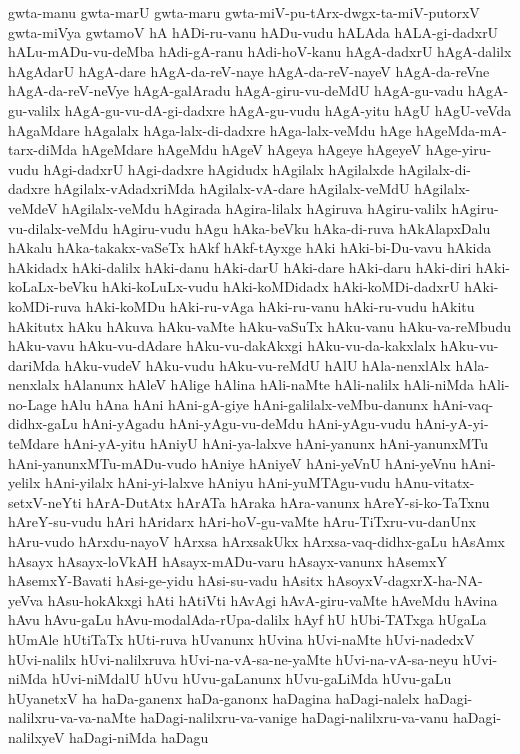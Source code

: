 {gwta-manu
gwta-marU
gwta-maru
gwta-miV-pu-tArx-dwgx-ta-miV-putorxV
gwta-miVya
gwtamoV
hA
hADi-ru-vanu
hADu-vudu
hALAda
hALA-gi-dadxrU
hALu-mADu-vu-deMba
hAdi-gA-ranu
hAdi-hoV-kanu
hAgA-dadxrU
hAgA-dalilx
hAgAdarU
hAgA-dare
hAgA-da-reV-naye
hAgA-da-reV-nayeV
hAgA-da-reVne
hAgA-da-reV-neVye
hAgA-galAradu
hAgA-giru-vu-deMdU
hAgA-gu-vadu
hAgA-gu-valilx
hAgA-gu-vu-dA-gi-dadxre
hAgA-gu-vudu
hAgA-yitu
hAgU
hAgU-veVda
hAgaMdare
hAgalalx
hAga-lalx-di-dadxre
hAga-lalx-veMdu
hAge
hAgeMda-mA-tarx-diMda
hAgeMdare
hAgeMdu
hAgeV
hAgeya
hAgeye
hAgeyeV
hAge-yiru-vudu
hAgi-dadxrU
hAgi-dadxre
hAgidudx
hAgilalx
hAgilalxde
hAgilalx-di-dadxre
hAgilalx-vAdadxriMda
hAgilalx-vA-dare
hAgilalx-veMdU
hAgilalx-veMdeV
hAgilalx-veMdu
hAgirada
hAgira-lilalx
hAgiruva
hAgiru-valilx
hAgiru-vu-dilalx-veMdu
hAgiru-vudu
hAgu
hAka-beVku
hAka-di-ruva
hAkAlapxDalu
hAkalu
hAka-takakx-vaSeTx
hAkf
hAkf-tAyxge
hAki
hAki-bi-Du-vavu
hAkida
hAkidadx
hAki-dalilx
hAki-danu
hAki-darU
hAki-dare
hAki-daru
hAki-diri
hAki-koLaLx-beVku
hAki-koLuLx-vudu
hAki-koMDidadx
hAki-koMDi-dadxrU
hAki-koMDi-ruva
hAki-koMDu
hAki-ru-vAga
hAki-ru-vanu
hAki-ru-vudu
hAkitu
hAkitutx
hAku
hAkuva
hAku-vaMte
hAku-vaSuTx
hAku-vanu
hAku-va-reMbudu
hAku-vavu
hAku-vu-dAdare
hAku-vu-dakAkxgi
hAku-vu-da-kakxlalx
hAku-vu-dariMda
hAku-vudeV
hAku-vudu
hAku-vu-reMdU
hAlU
hAla-nenxlAlx
hAla-nenxlalx
hAlanunx
hAleV
hAlige
hAlina
hAli-naMte
hAli-nalilx
hAli-niMda
hAli-no-Lage
hAlu
hAna
hAni
hAni-gA-giye
hAni-galilalx-veMbu-danunx
hAni-vaq-didhx-gaLu
hAni-yAgadu
hAni-yAgu-vu-deMdu
hAni-yAgu-vudu
hAni-yA-yi-teMdare
hAni-yA-yitu
hAniyU
hAni-ya-lalxve
hAni-yanunx
hAni-yanunxMTu
hAni-yanunxMTu-mADu-vudo
hAniye
hAniyeV
hAni-yeVnU
hAni-yeVnu
hAni-yelilx
hAni-yilalx
hAni-yi-lalxve
hAniyu
hAni-yuMTAgu-vudu
hAnu-vitatx-setxV-neYti
hArA-DutAtx
hArATa
hAraka
hAra-vanunx
hAreY-si-ko-TaTxnu
hAreY-su-vudu
hAri
hAridarx
hAri-hoV-gu-vaMte
hAru-TiTxru-vu-danUnx
hAru-vudo
hArxdu-nayoV
hArxsa
hArxsakUkx
hArxsa-vaq-didhx-gaLu
hAsAmx
hAsayx
hAsayx-loVkAH
hAsayx-mADu-varu
hAsayx-vanunx
hAsemxY
hAsemxY-Bavati
hAsi-ge-yidu
hAsi-su-vadu
hAsitx
hAsoyxV-dagxrX-ha-NA-yeVva
hAsu-hokAkxgi
hAti
hAtiVti
hAvAgi
hAvA-giru-vaMte
hAveMdu
hAvina
hAvu
hAvu-gaLu
hAvu-modalAda-rUpa-dalilx
hAyf
hU
hUbi-TATxga
hUgaLa
hUmAle
hUtiTaTx
hUti-ruva
hUvanunx
hUvina
hUvi-naMte
hUvi-nadedxV
hUvi-nalilx
hUvi-nalilxruva
hUvi-na-vA-sa-ne-yaMte
hUvi-na-vA-sa-neyu
hUvi-niMda
hUvi-niMdalU
hUvu
hUvu-gaLanunx
hUvu-gaLiMda
hUvu-gaLu
hUyanetxV
ha
haDa-ganenx
haDa-ganonx
haDagina
haDagi-nalelx
haDagi-nalilxru-va-va-naMte
haDagi-nalilxru-va-vanige
haDagi-nalilxru-va-vanu
haDagi-nalilxyeV
haDagi-niMda
haDagu
}
